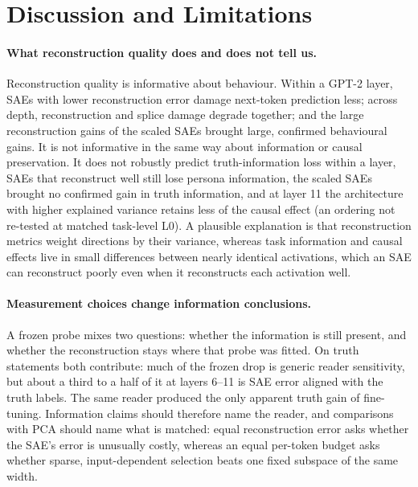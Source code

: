 \section{Discussion and Limitations}\label{sec:discussion}

\paragraph{What reconstruction quality does and does not tell us.} Reconstruction quality is informative about
behaviour. Within a GPT-2 layer, SAEs with lower reconstruction error damage next-token prediction less; across depth,
reconstruction and splice damage degrade together; and the large reconstruction gains of the scaled SAEs brought large,
confirmed behavioural gains. It is not informative in the same way about information or causal preservation. It does
not robustly predict truth-information loss within a layer, SAEs that reconstruct well still lose persona information,
the scaled SAEs brought no confirmed gain in truth information, and at layer 11 the architecture with higher explained
variance retains less of the causal effect (an ordering not re-tested at matched task-level L0). A plausible explanation is that reconstruction metrics weight directions by
their variance, whereas task information and causal effects live in small differences between nearly identical
activations, which an SAE can reconstruct poorly even when it reconstructs each activation well.

\paragraph{Measurement choices change information conclusions.} A frozen probe mixes two questions: whether the
information is still present, and whether the reconstruction stays where that probe was fitted. On truth statements
both contribute: much of the frozen drop is generic reader sensitivity, but about a third to a half of it at layers
6--11 is SAE error aligned with the truth labels. The same reader produced the only apparent truth gain of
fine-tuning. Information claims
should therefore name the reader, and comparisons with PCA should name what is matched: equal reconstruction error asks
whether the SAE's error is unusually costly, whereas an equal per-token budget asks whether sparse, input-dependent
selection beats one fixed subspace of the same width.

